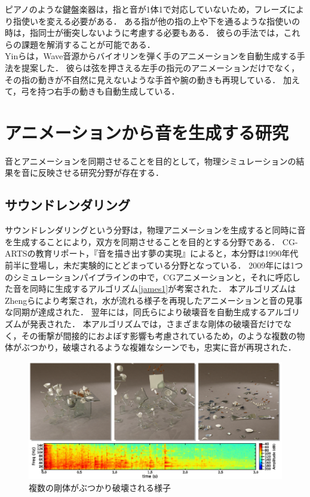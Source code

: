 ピアノのような鍵盤楽器は，指と音が1体1で対応していないため，フレーズにより指使いを変える必要がある．
ある指が他の指の上や下を通るような指使いの時は，指同士が衝突しないように考慮する必要もある．
彼らの手法では，これらの課題を解消することが可能である．\\
\indent
Yin\cite{violin}らは，Wave音源からバイオリンを弾く手のアニメーションを自動生成する手法を提案した．
彼らは弦を押さえる左手の指元のアニメーションだけでなく，その指の動きが不自然に見えないような手首や腕の動きも再現している．
加えて，弓を持つ右手の動きも自動生成している．
%
\section{アニメーションから音を生成する研究}\label{sec:generate_sound}
音とアニメーションを同期させることを目的として，物理シミュレーションの結果を音に反映させる研究分野が存在する．\\
%
\subsection{サウンドレンダリング}
サウンドレンダリングという分野は，物理アニメーションを生成すると同時に音を生成することにより，双方を同期させることを目的とする分野である．
CG-ARTSの教育リポート，『音を描き出す夢の実現』\cite{CG-ARTS}によると，本分野は1990年代前半に登場し，未だ実験的にとどまっている分野となっている．
2009年には1つのシミュレーションパイプラインの中で，CGアニメーションと，それに呼応した音を同時に生成するアルゴリズム\ref{james1}が考案された．
本アルゴリズムはZhengらにより考案され，水が流れる様子を再現したアニメーションと音の見事な同期が達成された．
%
翌年には，同氏らにより破壊音を自動生成するアルゴリズム\cite{james2}が発表された．
本アルゴリズムでは，さまざまな剛体の破壊音だけでなく，その衝撃が間接的におよぼす影響も考慮されているため，のような複数の物体がぶつかり，破壊されるような複雑なシーンでも，忠実に音が再現された．
\begin{figure}[h]
	\centering
	\includegraphics[width=14cm]{fig/chap2/james2.eps}
	\caption{複数の剛体がぶつかり破壊される様子}
	\label{fig:james2}
\end{figure}

